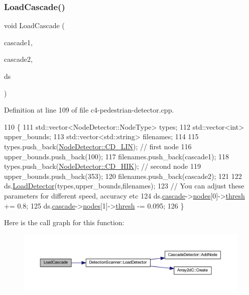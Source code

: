 \subsubsection{\texorpdfstring{Load\+Cascade()}{LoadCascade()}}
{\footnotesize\ttfamily void Load\+Cascade (\begin{DoxyParamCaption}\item[{std\+::string}]{cascade1,  }\item[{std\+::string}]{cascade2,  }\item[{\mbox{\hyperlink{class_detection_scanner}{Detection\+Scanner}} \&}]{ds }\end{DoxyParamCaption})}



Definition at line 109 of file c4-\/pedestrian-\/detector.\+cpp.


\begin{DoxyCode}
110 \{
111     std::vector<NodeDetector::NodeType> types;
112     std::vector<int> upper\_bounds;
113     std::vector<std::string> filenames;
114 
115     types.push\_back(\mbox{\hyperlink{class_node_detector_a7188c48dfe6b88b3b7f47c599c4832bda0fae40660f7fc68812bec11a7de3413e}{NodeDetector::CD\_LIN}}); \textcolor{comment}{// first node}
116     upper\_bounds.push\_back(100);
117     filenames.push\_back(cascade1);
118     types.push\_back(\mbox{\hyperlink{class_node_detector_a7188c48dfe6b88b3b7f47c599c4832bda65deee8e79173b207da52debff561c83}{NodeDetector::CD\_HIK}}); \textcolor{comment}{// second node}
119     upper\_bounds.push\_back(353);
120     filenames.push\_back(cascade2);
121 
122     ds.\mbox{\hyperlink{class_detection_scanner_a36c4db431f28648b82bd6e55afb67008}{LoadDetector}}(types,upper\_bounds,filenames);
123     \textcolor{comment}{// You can adjust these parameters for different speed, accuracy etc}
124     ds.\mbox{\hyperlink{class_detection_scanner_a5fd4ac1b6a6c56a95543eca549c26634}{cascade}}->\mbox{\hyperlink{class_cascade_detector_a7977422f255cf4d753665c0c6a0b0f07}{nodes}}[0]->\mbox{\hyperlink{class_node_detector_a2fd8792e80f3f31d2d07831a5169935f}{thresh}} += 0.8;
125     ds.\mbox{\hyperlink{class_detection_scanner_a5fd4ac1b6a6c56a95543eca549c26634}{cascade}}->\mbox{\hyperlink{class_cascade_detector_a7977422f255cf4d753665c0c6a0b0f07}{nodes}}[1]->\mbox{\hyperlink{class_node_detector_a2fd8792e80f3f31d2d07831a5169935f}{thresh}} -= 0.095;
126 \}
\end{DoxyCode}
Here is the call graph for this function\+:\nopagebreak
\begin{figure}[H]
\begin{center}
\leavevmode
\includegraphics[width=350pt]{c4-pedestrian-detector_8h_a1c2c730891bb9a5800d3761e8cfaa160_cgraph}
\end{center}
\end{figure}
